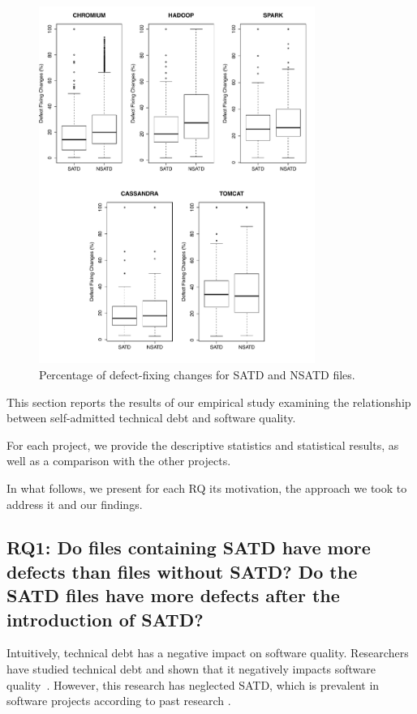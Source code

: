 \begin{figure}[tb]
	\centering
	\includegraphics[width=90mm]{figures/chapter3/rq1_correction}
	\caption{Percentage of defect-fixing changes for SATD and NSATD files.}
	\label{figure:number_of_fixing_changes_TD_vs_NTD}
\end{figure}

This section reports the results of our empirical study examining the relationship between self-admitted technical debt and software quality. 

For each project, we provide the descriptive statistics and statistical results, as well as a comparison with the other projects. 



In what follows, we present for each RQ its motivation, the approach we took to address it and our findings.


\subsection*{RQ1: Do files containing SATD have more defects than files without SATD? Do the SATD files have more defects after the introduction of SATD?}

 Intuitively, technical debt has a negative impact on software quality. Researchers have studied technical debt and shown that it negatively impacts software quality~\cite{zazworka2011investigating}. However, this research has neglected SATD, which is prevalent in software projects according to past research \cite{ICSM_PotdarS14}.

